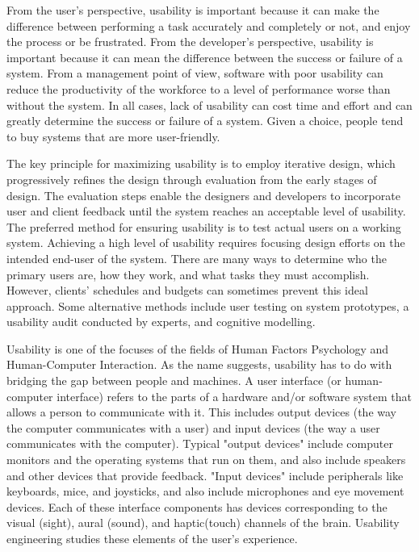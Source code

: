From the user's perspective, usability is important because it can make the difference between performing a task accurately and completely or not, and enjoy the process or be frustrated. From the developer's perspective, usability is important because it can mean the difference between the success or failure of a system. From a management point of view, software with poor usability can reduce the productivity of the workforce to a level of performance worse than without the system. In all cases, lack of usability can cost time and effort and can greatly determine the success or failure of a system. Given a choice, people tend to buy systems that are more user-friendly.

\smallskip

The key principle for maximizing usability is to employ iterative design, which progressively refines the design through evaluation from the early stages of design. The evaluation steps enable the designers and developers to incorporate user and client feedback until the system reaches an acceptable level of usability.\\

The preferred method for ensuring usability is to test actual users on a working system. Achieving a high level of usability requires focusing design efforts on the intended end-user of the system. There are many ways to determine who the primary users are, how they work, and what tasks they must accomplish. However, clients' schedules and budgets can sometimes prevent this ideal approach. Some alternative methods include user testing on system prototypes, a usability audit conducted by experts, and cognitive modelling.

\smallskip

Usability is one of the focuses of the fields of Human Factors Psychology and Human-Computer Interaction. As the name suggests, usability has to do with bridging the gap between people and machines. A user interface (or human-computer interface) refers to the parts of a hardware and/or software system that allows a person to communicate with it. This includes output devices (the way the computer communicates with a user) and input devices (the way a user communicates with the computer). Typical "output devices" include computer monitors and the operating systems that run on them, and also include speakers and other devices that provide feedback. "Input devices" include peripherals like keyboards, mice, and joysticks, and also include microphones and eye movement devices. Each of these interface components has devices corresponding to the visual (sight), aural (sound), and haptic(touch) channels of the brain. Usability engineering studies these elements of the user's experience.

